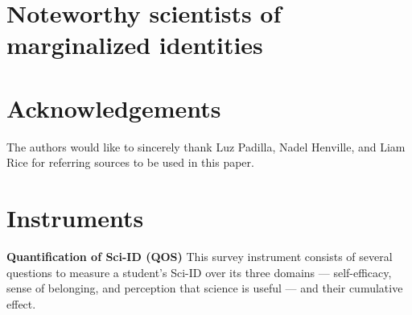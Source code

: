 \documentclass[10pt, twocolumn]{article}
\begin{document}
\section{Noteworthy scientists of marginalized identities}

\section*{Acknowledgements}

The authors would like to sincerely thank Luz Padilla, Nadel Henville, and Liam Rice for referring sources to be used in this paper.

\printbibliography

\onecolumn

\appendix

\section{Instruments}


\begin{instrument}
    \caption{\textbf{Quantification of Sci-ID (QOS)} This survey instrument consists of several questions to measure a student's Sci-ID over its three domains --- self-efficacy, sense of belonging, and perception that science is useful --- and their cumulative effect.} \label{inst:sci-id}
\end{instrument}
\end{document}
